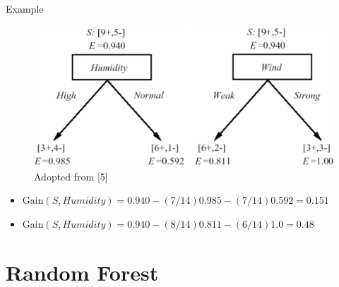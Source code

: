 \documentclass[serif, aspectratio=169]{beamer}
\begin{document}
\begin{frame}{Example}
    \begin{center}
    \begin{figure}[bh]
        \includegraphics[width=\textwidth]{pic/informationgain.png}
        {\scriptsize Adopted from [5]}
    \end{figure}
    \endminipage
    \end{center}

    \begin{itemize}
    \itemsep1em
    \justifying
    \item[] $\text{Gain}(S, Humidity) = 0.940 - (7/14) 0.985 - (7/14) 0.592 = 0.151$
    \item[] $\text{Gain}(S, Humidity) = 0.940 - (8/14) 0.811 - (6/14) 1.0 = 0.48$
    \end{itemize}
\end{frame}

\section{Random Forest}
\end{document}

